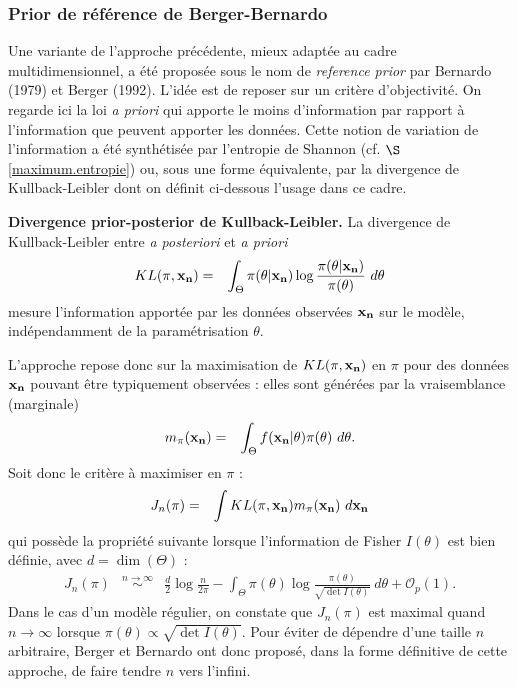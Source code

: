 \if{} \vspace{1cm} 
\fi
\vspace{0.5cm}



\subsubsection{Prior de référence de Berger-Bernardo }

Une variante de l'approche précédente, mieux adaptée au cadre multidimensionnel, a été proposée sous le nom de \emph{reference prior} par Bernardo (1979) et Berger (1992). L’idée est de reposer sur un critère d’objectivité. On regarde ici la loi {\it a priori} qui apporte le moins d’information par rapport à l'information que peuvent apporter les données. Cette notion de variation de l'information a été synthétisée par l'entropie de Shannon (cf. $\S$ \ref{maximum.entropie}) ou, sous une forme équivalente, par la divergence de Kullback-Leibler dont on définit ci-dessous l'usage dans ce cadre. 

\begin{definition}{\bf Divergence prior-posterior de Kullback-Leibler.}
La divergence de Kullback-Leibler entre {\it a posteriori} et {\it a priori}
\begin{eqnarray*}
KL(\pi,{\bf x_n}) & = & \int_{\Theta} \pi(\theta|{\bf x_n}) \log \frac{\pi(\theta|{\bf x_n})}{\pi(\theta)} \ d {\theta}
\end{eqnarray*}
mesure l'information apportée par les données observées ${\bf x_n}$ sur le modèle, indépendamment de la paramétrisation $\theta$.
\end{definition}

L'approche repose donc sur la maximisation de $KL(\pi,{\bf x_n})$ en $\pi$  pour des données ${\bf x_n}$ pouvant être typiquement observées : elles sont générées par la {vraisemblance} (marginale)
\begin{eqnarray*}
m_{\pi}({\bf x_n}) & = & \int_{\Theta} f({\bf x_n}|\theta) \pi(\theta) \ d\theta.
\end{eqnarray*} 
Soit donc le critère à maximiser en $\pi$ :
\begin{eqnarray*}
J_n(\pi) & = & \int KL(\pi,{\bf x_n}) m_{\pi}({\bf x_n}) \ d{\bf x_n}
\end{eqnarray*}
qui possède la propriété suivante lorsque l'information de Fisher $I(\theta)$ est bien définie, avec $d=\dim(\Theta)$ :
\begin{eqnarray*}
J_n(\pi) & \overset{n\to\infty}{\sim} & \frac{d}{2}\log \frac{n}{2\pi} - \int_{\Theta} \pi(\theta) \log\frac{\pi(\theta)}{\sqrt{\det I(\theta)}} \ d\theta + \mathcal{O}_p(1).
\end{eqnarray*}
Dans le cas d’un modèle régulier, on constate que $J_n(\pi)$ est maximal quand $n\to\infty$ lorsque $\pi(\theta)\propto \sqrt{\det I(\theta)}$. Pour éviter de dépendre d'une taille $n$ arbitraire, Berger et Bernardo ont donc proposé, dans la forme définitive de cette approche, de faire tendre $n$ vers l'infini.

